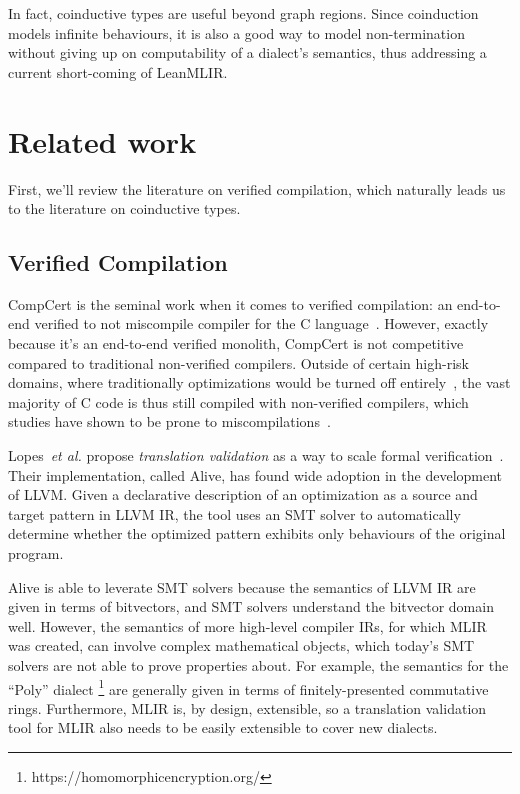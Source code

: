 \documentclass[a4paper]{scrartcl}
\newcommand*{\etal}{~\emph{et al.}}
\begin{document}
In fact, coinductive types are useful beyond graph regions. Since
coinduction models infinite behaviours, it is also a good way to model
non-termination without giving up on computability of a dialect's
semantics, thus addressing a current short-coming of LeanMLIR.



\section{Related work}\label{related-work}

First, we'll review the literature on verified compilation, which
naturally leads us to the literature on coinductive types.

\subsection{Verified Compilation}\label{verified-compilation}

CompCert is the
seminal work when it comes to verified compilation: an end-to-end
verified to not miscompile compiler for the C language~\cite{leroyCompCertFormallyVerified}.
However, exactly
because it's an end-to-end verified monolith, CompCert is not
competitive compared to traditional non-verified compilers. Outside of
certain high-risk domains, where traditionally optimizations would be
turned off entirely~\cite{kastnerCompCertPracticalExperience},
the vast majority of C code is thus still compiled with non-verified
compilers, which studies have shown to be prone to miscompilations~\cite{yangFindingUnderstandingBugs2011}.

Lopes\etal{} propose \emph{translation validation} as a way to scale
formal verification~\cite{lopesAlive2BoundedTranslation2021}.
Their implementation, called Alive, has found wide adoption in the
development of LLVM. Given a declarative description of an optimization
as a source and target pattern in LLVM IR, the tool uses an SMT solver
to automatically determine whether the optimized pattern exhibits only
behaviours of the original program.

Alive is able to leverate SMT solvers because the semantics of LLVM IR
are given in terms of bitvectors, and SMT solvers understand the
bitvector domain well. However, the semantics of more high-level
compiler IRs, for which MLIR was created, can involve complex
mathematical objects, which today's SMT solvers are not able to prove
properties about. For example, the semantics for the ``Poly'' dialect
\footnote{https://homomorphicencryption.org/} are generally given in
terms of finitely-presented commutative rings. Furthermore, MLIR is, by
design, extensible, so a translation validation tool for MLIR also needs
to be easily extensible to cover new dialects.
\end{document}
